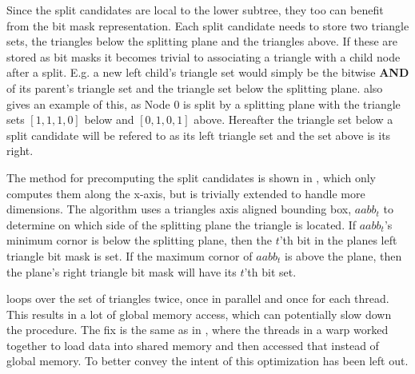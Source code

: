 
Since the split candidates are local to the lower subtree, they too can benefit
from the bit mask representation. Each split candidate needs to store two
triangle sets, the triangles below the splitting plane and the triangles
above. If these are stored as bit masks it becomes trivial to associating a
triangle with a child node after a split. E.g. a new left child's triangle set
would simply be the bitwise \textbf{AND} of its parent's triangle set and the
triangle set below the splitting plane.  also gives an
example of this, as Node 0 is split by a splitting plane with the triangle sets
$[1,1,1,0]$ below and $[0,1,0,1]$ above. Hereafter the triangle set below a
split candidate will be refered to as its left triangle set and the set above is
its right.

The method for precomputing the split candidates is shown in
, which only computes them along the x-axis, but
is trivially extended to handle more dimensions. The algorithm uses a triangles
axis aligned bounding box, $aabb_t$ to determine on which side of the splitting
plane the triangle is located. If $aabb_t$'s minimum cornor is below the
splitting plane, then the $t$'th bit in the planes left triangle bit mask is
set. If the maximum cornor of $aabb_t$ is above the plane, then the plane's
right triangle bit mask will have its $t$'th bit set.


 loops over the set of triangles twice, once in
parallel and once for each thread. This results in a lot of global memory
access, which can potentially slow down the procedure. The fix is the same as in
, where the threads in a warp worked together to
load data into shared memory and then accessed that instead of global memory. To
better convey the intent of  this optimization
has been left out.


